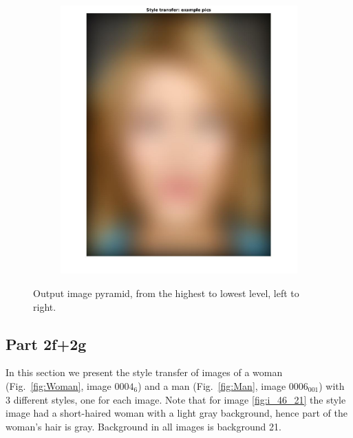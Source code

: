 \documentclass[a4paper]{iacas}
\begin{document}
\begin{figure}[!htbp]
\begin{subfigure}[b]{0.15\textwidth}
		\caption{}
		\label{fig:405}
	\end{subfigure}
	\begin{subfigure}[b]{0.15\textwidth}
		\includegraphics[width=\textwidth]{406.jpg}
		\caption{}
		\label{fig:406}
	\end{subfigure}
	
	\caption{Output image pyramid, from the highest to lowest level, left to right.}
	\label{fig:400}
\end{figure}

\subsection{Part 2f+2g}

In this section we present the style transfer of images of a woman (Fig.~\ref{fig:Woman}, image $0004_6$) and a man (Fig.~\ref{fig:Man}, image $0006_001$) with 3 different styles, one for each image. Note that for image \ref{fig:i_46_21} the style image had a short-haired woman with a light gray background, hence part of the woman's hair is gray. Background in all images is background 21.
\end{document}
